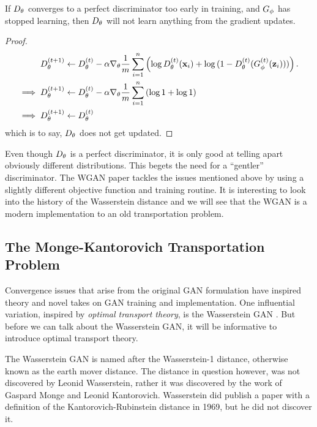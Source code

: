 \begin{theorem} If $D_\theta$ converges to a perfect discriminator too early
  in training, and $G_\phi$ has stopped learning, then $D_\theta$ will not learn
  anything from the gradient updates.
\end{theorem}

\begin{proof}
  \begin{align}
    \label{eq:d-updates-no-good} D_\theta^{(t+1)} & \gets D_\theta^{(t)} -
                                              \alpha\nabla_\theta {1 \over m} \sum_{i=1}^n \left( \log
                                              D^{(t)}_\theta(\mathbf{x}_i) + \log{(1 -
                                              D^{(t)}_\theta(G^{(t)}_\phi(\mathbf{z}_i)))} \right). \\ \implies
    D_\theta^{(t+1)} & \gets D_\theta^{(t)} - \alpha\nabla_\theta {1 \over m}
                 \sum_{i=1}^n \left( \log{1} + \log{1} \right) \\ \implies D_\theta^{(t+1)} &
                                                                                        \gets D_\theta^{(t)}
  \end{align} which is to say, $D_\theta$ does not get updated.
\end{proof}

Even though $D_\theta$ is a perfect discriminator, it is only good at
telling apart obviously different distributions. This begets the need
for a ``gentler'' discriminator.  The WGAN paper tackles the issues
mentioned above by using a slightly different objective function and
training routine.  It is interesting to look into the history of the
Wasserstein distance and we will see that the WGAN is a modern
implementation to an old transportation problem.

\subsection{The Monge-Kantorovich Transportation Problem}

Convergence issues that arise from the original GAN formulation have
inspired theory and novel takes on GAN training and
implementation. One influential variation, inspired by \textit{optimal
  transport theory}, is the Wasserstein GAN
\cite{ref:arjovsky-2017}. But before we can talk about the Wasserstein
GAN, it will be informative to introduce optimal transport theory.

The Wasserstein GAN is named after the Wasserstein-1 distance,
otherwise known as the earth mover distance. The distance in question
however, was not discovered by Leonid Wasserstein, rather it was
discovered by the work of Gaspard Monge and Leonid
Kantorovich. Wasserstein did publish a paper with a definition of the
Kantorovich-Rubinstein distance in 1969, but he did not discover it.

